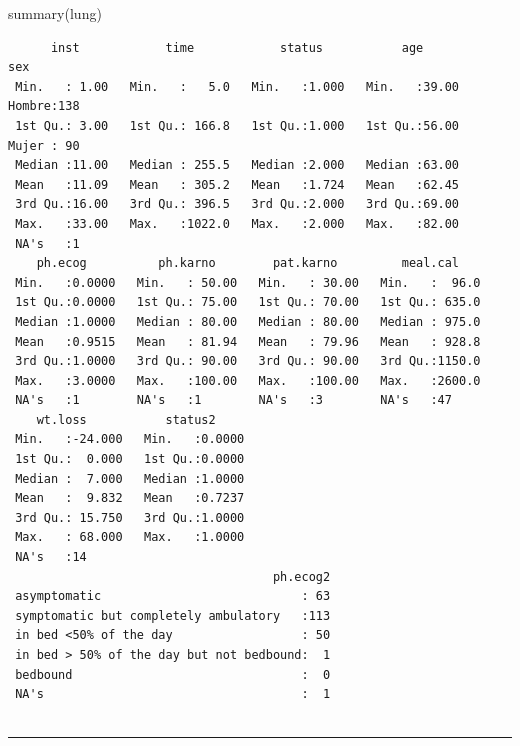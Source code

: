 \documentclass[
]{article}
\newenvironment{Shaded}{\begin{snugshade}}{\end{snugshade}}
\newcommand{\AttributeTok}[1]{\textcolor[rgb]{0.40,0.45,0.13}{#1}}
\newcommand{\FunctionTok}[1]{\textcolor[rgb]{0.28,0.35,0.67}{#1}}
\newcommand{\NormalTok}[1]{\textcolor[rgb]{0.00,0.23,0.31}{#1}}
\newcommand{\OtherTok}[1]{\textcolor[rgb]{0.00,0.23,0.31}{#1}}
\newcommand{\SpecialCharTok}[1]{\textcolor[rgb]{0.37,0.37,0.37}{#1}}
\begin{document}
\begin{Shaded}
\begin{Highlighting}[]
\FunctionTok{summary}\NormalTok{(lung)}
\end{Highlighting}
\end{Shaded}

\begin{verbatim}
      inst            time            status           age            sex     
 Min.   : 1.00   Min.   :   5.0   Min.   :1.000   Min.   :39.00   Hombre:138  
 1st Qu.: 3.00   1st Qu.: 166.8   1st Qu.:1.000   1st Qu.:56.00   Mujer : 90  
 Median :11.00   Median : 255.5   Median :2.000   Median :63.00               
 Mean   :11.09   Mean   : 305.2   Mean   :1.724   Mean   :62.45               
 3rd Qu.:16.00   3rd Qu.: 396.5   3rd Qu.:2.000   3rd Qu.:69.00               
 Max.   :33.00   Max.   :1022.0   Max.   :2.000   Max.   :82.00               
 NA's   :1                                                                    
    ph.ecog          ph.karno        pat.karno         meal.cal     
 Min.   :0.0000   Min.   : 50.00   Min.   : 30.00   Min.   :  96.0  
 1st Qu.:0.0000   1st Qu.: 75.00   1st Qu.: 70.00   1st Qu.: 635.0  
 Median :1.0000   Median : 80.00   Median : 80.00   Median : 975.0  
 Mean   :0.9515   Mean   : 81.94   Mean   : 79.96   Mean   : 928.8  
 3rd Qu.:1.0000   3rd Qu.: 90.00   3rd Qu.: 90.00   3rd Qu.:1150.0  
 Max.   :3.0000   Max.   :100.00   Max.   :100.00   Max.   :2600.0  
 NA's   :1        NA's   :1        NA's   :3        NA's   :47      
    wt.loss           status2      
 Min.   :-24.000   Min.   :0.0000  
 1st Qu.:  0.000   1st Qu.:0.0000  
 Median :  7.000   Median :1.0000  
 Mean   :  9.832   Mean   :0.7237  
 3rd Qu.: 15.750   3rd Qu.:1.0000  
 Max.   : 68.000   Max.   :1.0000  
 NA's   :14                        
                                     ph.ecog2  
 asymptomatic                            : 63  
 symptomatic but completely ambulatory   :113  
 in bed <50% of the day                  : 50  
 in bed > 50% of the day but not bedbound:  1  
 bedbound                                :  0  
 NA's                                    :  1  
                                               
\end{verbatim}

\begin{center}\rule{0.5\linewidth}{0.5pt}\end{center}

\begin{Shaded}
\end{Shaded}
\end{document}
